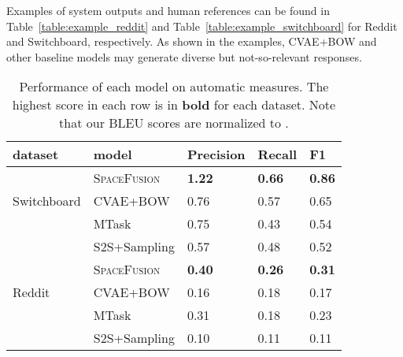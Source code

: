 \documentclass[11pt,a4paper]{article}
\begin{document}
Examples of  system outputs and human references can be found in Table~\ref{table:example_reddit} and Table~\ref{table:example_switchboard} for Reddit and Switchboard, respectively. As shown in the examples, CVAE+BOW and other baseline models may generate diverse but not-so-relevant responses. 

\begin{table}[ht]
    \centering
    \small
    \begin{tabular}{p{}|p{}|p{}p{}p{}} \hline 
     
    dataset & model           &  Precision    & Recall        & F1 \\ \hline
                & \textsc{SpaceFusion}      & \textbf{1.22} & \textbf{0.66} &  \textbf{0.86} \\ 
    Switchboard & CVAE+BOW     & 0.76          & 0.57          & 0.65 \\
                & MTask   & 0.75          & 0.43          & 0.54 \\ 
                & S2S+Sampling & 0.57          & 0.48          & 0.52 \\ \hline
                & \textsc{SpaceFusion}      & \textbf{0.40} & \textbf{0.26} & \textbf{0.31} \\ 
    Reddit      & CVAE+BOW     & 0.16          & 0.18          & 0.17 \\
                & MTask   & 0.31          & 0.18          & 0.23 \\ 
                & S2S+Sampling & 0.10          & 0.11          & 0.11 \\ \hline
    
    \end{tabular}
    \caption{Performance of each model on automatic measures. The highest score in each row is in \textbf{bold} for each dataset. Note that our BLEU scores are normalized to .}
    \label{table:auto}
\end{table}
\end{document}
